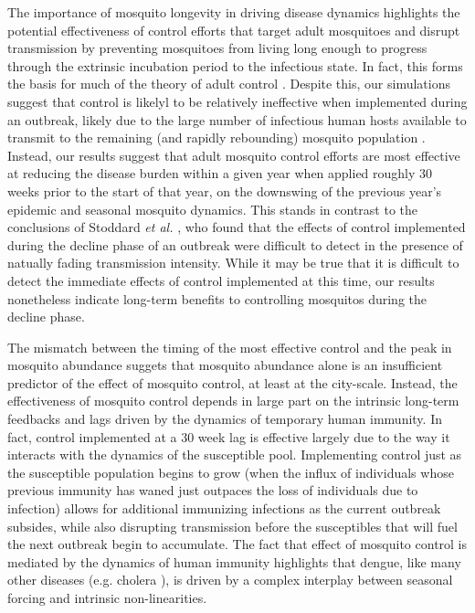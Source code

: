 \documentclass[10pt,letterpaper]{article}
\begin{document}
The importance of mosquito longevity in driving disease dynamics highlights the potential effectiveness of control efforts that target adult mosquitoes and disrupt transmission by preventing mosquitoes from living long enough to progress through the extrinsic incubation period to the infectious state.
In fact, this forms the basis for much of the theory of adult control \cite{Burattini2008, Morrison2008, Smith2012}.
Despite this, our simulations suggest that control is likelyl to be relatively ineffective when implemented during an outbreak, likely due to the large number of infectious human hosts available to transmit to the remaining (and rapidly rebounding) mosquito population \cite{Newton1992, Burattini2008}.
Instead, our results suggest that adult mosquito control efforts are most effective at reducing the disease burden within a given year when applied roughly 30 weeks prior to the start of that year, on the downswing of the previous year's epidemic and seasonal mosquito dynamics.
This stands in contrast to the conclusions of Stoddard \emph{et al.} \cite{Stoddard2014}, who found that the effects of control implemented during the decline phase of an outbreak were difficult to detect in the presence of natually fading transmission intensity.
While it may be true that it is difficult to detect the immediate effects of control implemented at this time, our results nonetheless indicate long-term benefits to controlling mosquitos during the decline phase.

The mismatch between the timing of the most effective control and the peak in mosquito abundance suggets that mosquito abundance alone is an insufficient predictor of the effect of mosquito control, at least at the city-scale.
Instead, the effectiveness of mosquito control depends in large part on the intrinsic long-term feedbacks and lags driven by the dynamics of temporary human immunity.
In fact, control implemented at a 30 week lag is effective largely due to the way it interacts with the dynamics of the susceptible pool. 
Implementing control just as the susceptible population begins to grow (when the influx of individuals whose previous immunity has waned just outpaces the loss of individuals due to infection) allows for additional immunizing infections as the current outbreak subsides, while also disrupting transmission before the susceptibles that will fuel the next outbreak begin to accumulate.
The fact that effect of mosquito control is mediated by the dynamics of human immunity highlights that dengue, like many other diseases (e.g. cholera \cite{Koelle2004, Koelle2005}), is driven by a complex interplay between seasonal forcing and intrinsic non-linearities.
\end{document}
